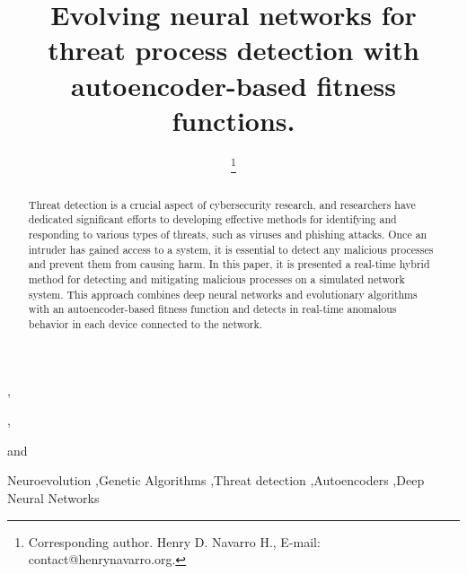 \documentclass{iosart2c}
\begin{document}
\begin{frontmatter}                           %

%
\title{Evolving neural networks for threat process detection with autoencoder-based fitness functions.}



\author[A,B]{ \thanks{Corresponding author. Henry D. Navarro H., E-mail: contact@henrynavarro.org.}},
\author[B]{ },
\author[B]{ }
and
\author[B]{ }
\address[A]{Research and Development Lab, Vision Analytics, Avenida de Europa 19, 28224, Pozuelo de Alarcón, Madrid,\\ Spain\\
E-mail: contact@henrynavarro.org}
\address[B]{R\&D Department, Capgemini Engineering, Calle Campezo, 1, 28022, Madrid, Spain.\\
E-mail: engineering@capgemini.com}

\begin{abstract}
Threat detection is a crucial aspect of cybersecurity research, and researchers have dedicated significant efforts to developing effective methods for identifying and responding to various types of threats, such as viruses and phishing attacks. Once an intruder has gained access to a system, it is essential to detect any malicious processes and prevent them from causing harm. In this paper, it is presented a real-time hybrid method for detecting and mitigating malicious processes on a simulated network system. This approach combines deep neural networks and evolutionary algorithms with an autoencoder-based fitness function and detects in real-time anomalous behavior in each device connected to the network.
\end{abstract}

\begin{keyword}
Neuroevolution \sep Genetic Algorithms \sep Threat detection \sep Autoencoders \sep Deep Neural Networks
\end{keyword}

\end{frontmatter}
\end{document}
